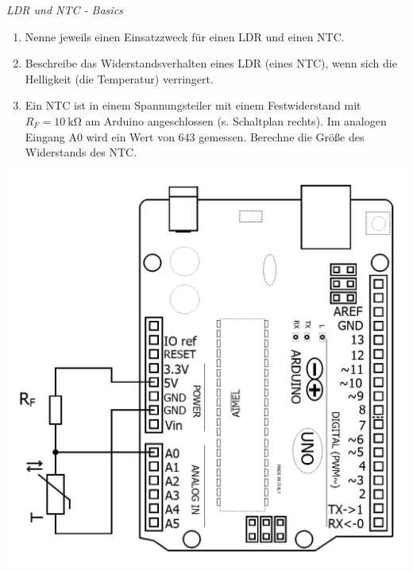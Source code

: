 \begin{aufgabe} \emph{LDR und NTC - Basics}
	
	\medskip
	\begin{minipage}{0.59\textwidth}
		\begin{enumerate}[label=\alph*), itemsep=0mm, parsep=0mm]
			\item Nenne jeweils einen Einsatzzweck für einen LDR und einen NTC.
			\item Beschreibe das Widerstandsverhalten eines LDR (eines NTC), wenn sich die Helligkeit (die Temperatur) verringert.
			\item Ein NTC ist in einem Spannungsteiler mit einem Festwiderstand mit $R_F=\SI{10}{\kilo\ohm}$ am Arduino angeschlossen (s. Schaltplan rechts). Im analogen Eingang A0 wird ein Wert von 643 gemessen. Berechne die Größe des Widerstands des NTC.
		\end{enumerate}
	\end{minipage}
	\hfill
	\begin{minipage}{0.39\textwidth}
		\centering
		\includegraphics[width=\textwidth]{./Zeichnungen/schaltplan-ntc-an-arduino.png}
	\end{minipage}


\end{aufgabe}
